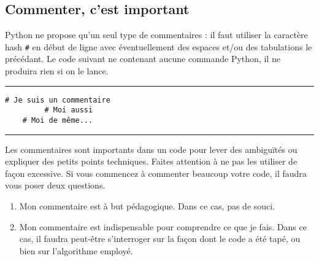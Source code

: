 \subsection{Commenter, c'est important}

Python ne propose qu'un seul type de commentaires : il faut utiliser la caractère hash \texttt{\#} en début de ligne avec éventuellement des espaces et/ou des tabulations le précédant. Le code suivant ne contenant aucune commande Python, il ne produira rien si on le lance.


\bigskip
{\hrule height .5mm}
\begin{verbatim}
# Je suis un commentaire
         # Moi aussi
    # Moi de même...
\end{verbatim}
{\hrule height .5mm}
\bigskip


Les commentaires sont importants dans un code pour lever des ambiguïtés ou expliquer des petits points techniques. Faites attention à ne pas les utiliser de façon excessive. Si vous commencez à commenter beaucoup votre code, il faudra vous poser deux questions.

\begin{enumerate}
\item Mon commentaire est à but pédagogique. Dans ce cas, pas de souci.

\item Mon commentaire est indispensable pour comprendre ce que je fais. Dans ce cas, il faudra peut-être s'interroger sur la façon dont le code a été tapé, ou bien sur l'algorithme employé.
\end{enumerate}